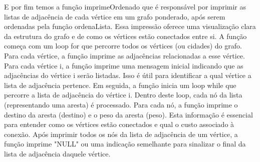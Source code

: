 \documentclass{article}
\begin{document}
E por fim temos a função imprimeOrdenado que é responsável por imprimir as listas de adjacência de cada vértice em um grafo ponderado, após serem ordenadas pela função ordenaLista. Essa impressão oferece uma visualização clara da estrutura do grafo e de como os vértices estão conectados entre si. A função começa com um loop for que percorre todos os vértices (ou cidades) do grafo. Para cada vértice, a função imprime as adjacências relacionadas a esse vértice. Para cada vértice i, a função imprime uma mensagem inicial indicando que as adjacências do vértice i serão listadas. Isso é útil para identificar a qual vértice a lista de adjacência pertence. Em seguida, a função inicia um loop while que percorre a lista de adjacência do vértice i. Dentro deste loop, cada nó da lista (representando uma aresta) é processado.
Para cada nó, a função imprime o destino da aresta (destino) e o peso da aresta (peso). Esta informação é essencial para entender como os vértices estão conectados e qual o custo associado à conexão. Após imprimir todos os nós da lista de adjacência de um vértice, a função imprime "NULL" ou uma indicação semelhante para sinalizar o final da lista de adjacência daquele vértice.
\end{document}
